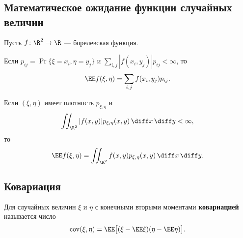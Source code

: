\clearpage
\begingroup
{}
\everymath{\textstyle}
\subsection{Математическое ожидание функции случайных величин}

Пусть $f\colon\R^2\to\R$ --- борелевская функция.

\begin{theorem}
    Если $p_{ij}=\Pr\{\xi=x_i,\eta=y_j\}$ и
    $\sum_{i,j}|f(x_i,y_j)|p_{ij}<\infty$, то
    \[
        \EE f(\xi,\eta)=\sum_{i,j}f(x_i,y_j)p_{ij}.
    \]
\end{theorem}

\begin{theorem}
    Если $(\xi,\eta)$ имеет плотность $p_{\xi,\eta}$ и
    \[
        \iint_{\R^2}|f(x,y)|p_{\xi,\eta}(x,y)\,\diff x\,\diff y<\infty,
    \]
    то
    \[
        \EE f(\xi,\eta)
        =\iint_{\R^2}f(x,y)p_{\xi,\eta}(x,y)\,\diff x\,\diff y.
    \]
\end{theorem}

\subsection{Ковариация}

\begin{definition}
    Для случайных величин $\xi$ и $\eta$ с конечными вторыми моментами
    \textbf{ковариацией} называется число
    \[
        \operatorname{cov}(\xi,\eta)
        =\EE\bigl[(\xi-\EE\xi)(\eta-\EE\eta)\bigr].
    \]
\end{definition}


